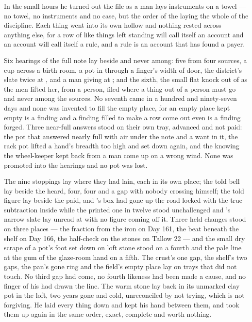 \scenebreak

In the small hours he turned out the file as a man lays instruments on a towel --- no towel, no instruments and no case, but the order of the laying the whole of the discipline. Each thing went into its own hollow and nothing rested across anything else, for a row of like things left standing will call itself an account and an account will call itself a rule, and a rule is an account that has found a payer.

Six hearings of the full note lay beside and never among: five from four sources, a cup across a birth room, a pot in  through a finger's width of door, the district's slate twice at , and a man giving at ; and the sixth, the small flat knock out of  as the men lifted her, from a person, filed where a thing out of a person must go and never among the sources. No seventh came in a hundred and ninety-seven days and none was invented to fill the empty place, for an empty place kept empty is a finding and a finding filled to make a row come out even is a finding forged. Three near-full answers stood on their own tray, advanced and not paid: the pot that answered nearly full with air under the note and a want in it, the rack pot lifted a hand's breadth too high and set down again, and the knowing the wheel-keeper kept back from a man come up on a wrong wind. None was promoted into the hearings and no pot was lost.

The nine stoppings lay where they had lain, each in its own place; the told bell lay beside the heard, four, four and a gap with nobody crossing himself; the told figure lay beside the paid, and 's box had gone up the road locked with the true subtraction inside while the printed one in twelve stood unchallenged and 's narrow slate lay unread at  with no figure coming off it. Three held changes stood on three places --- the fraction from the iron on Day 161, the beat beneath the shelf on Day 166, the half-check on the stones on Tallow 22 --- and the small dry scrape of a pot's foot set down on loft stone stood on a fourth and the pale line at the gum of the glaze-room hand on a fifth. The crust's one gap, the shelf's two gaps, the pan's gone ring and the field's empty place lay on trays that did not touch. No third gap had come, no fourth likeness had been made a cause, and no finger of his had drawn the line. The warm stone lay back in its unmarked clay pot in the loft, two years gone and cold, unreconciled by not trying, which is not forgiving. He laid every thing down and kept his hand between them, and took them up again in the same order, exact, complete and worth nothing.

